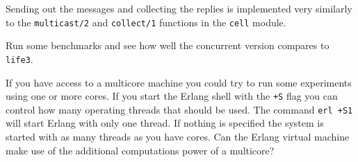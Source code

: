 \documentclass[a4paper,11pt]{article}
\begin{document}
Sending out the messages and collecting the replies is implemented
very similarly to the {\tt multicast/2} and {\tt collect/1} functions in
the {\tt cell} module.

Run some benchmarks and see how well the concurrent version compares to
{\tt life3}.

If you have access to a multicore machine you could try to run some
experiments using one or more cores. If you start the Erlang shell
with the {\tt +S} flag you can control how many operating threads
that should be used. The command {\tt erl +S1} will start Erlang with
only one thread. If nothing is specified the system is started with as
many threads as you have cores. Can the Erlang virtual machine make
use of the additional computations power of a multicore?
\end{document}
